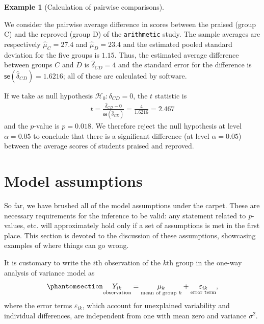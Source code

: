 \documentclass[
  11pt,
  letterpaper,
]{scrbook}
\theoremstyle{definition}
\theoremstyle{definition}
\newtheorem{example}{Example}[chapter]
\theoremstyle{remark}
\begin{document}
\begin{example}[Calculation of pairwise
comparisons]\protect\hypertarget{exm-pairwise-calcul}{}\label{exm-pairwise-calcul}

We consider the pairwise average difference in scores between the
praised (group C) and the reproved (group D) of the \texttt{arithmetic}
study. The sample averages are respectively \(\widehat{\mu}_C = 27.4\)
and \(\widehat{\mu}_D = 23.4\) and the estimated pooled standard
deviation for the five groups is \(1.15\). Thus, the estimated average
difference between groups \(C\) and \(D\) is
\(\widehat{\delta}_{CD} = 4\) and the standard error for the difference
is \(\mathsf{se}(\widehat{\delta}_{CD}) = 1.6216\); all of these are
calculated by software.

If we take as null hypothesis \(\mathscr{H}_0: \delta_{CD}=0\), the
\(t\) statistic is
\begin{align*}t=\frac{\widehat{\delta}_{CD} - 0}{\mathsf{se}(\widehat{\delta}_{CD})} = \frac{4}{1.6216}=2.467
\end{align*} and the \(p\)-value is \(p=0.018\). We therefore reject the
null hypothesis at level \(\alpha=0.05\) to conclude that there is a
significant difference (at level \(\alpha=0.05\)) between the average
scores of students praised and reproved.

\end{example}

\section{Model assumptions}\label{model-assumptions}

So far, we have brushed all of the model assumptions under the carpet.
These are necessary requirements for the inference to be valid: any
statement related to \emph{p}-values, etc. will approximately hold only
if a set of assumptions is met in the first place. This section is
devoted to the discussion of these assumptions, showcasing examples of
where things can go wrong.

It is customary to write the \(i\)th observation of the \(k\)th group in
the one-way analysis of variance model as
\begin{equation}\phantomsection\label{eq-onewayanova}{
\underset{\text{observation}}{Y_{ik}} = \underset{\text{mean of group $k$}}{\mu_k} + \underset{\text{error term}}{\varepsilon_{ik}},
}\end{equation} where the error terms \(\varepsilon_{ik}\), which
account for unexplained variability and individual differences, are
independent from one with mean zero and variance \(\sigma^2\).
\end{document}
